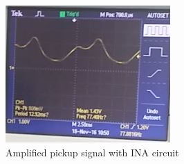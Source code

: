 \begin{figure}[!htpb]
\centering
\caption{Amplified pickup signal with INA circuit}
\label{INA-result}
\includegraphics[scale=1]{images/INA/result}
\end{figure}
